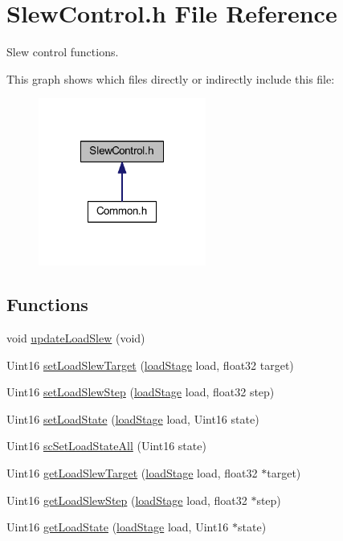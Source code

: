 \hypertarget{a00049}{\section{Slew\-Control.\-h File Reference}
\label{a00049}
}


Slew control functions.  


This graph shows which files directly or indirectly include this file\-:
\nopagebreak
\begin{figure}[H]
\begin{center}
\leavevmode
\includegraphics[width=156pt]{a00077}
\end{center}
\end{figure}
\subsection*{Functions}
\begin{DoxyCompactItemize}
\item 
void \hyperlink{a00049_a781fe23cb47009003e6d7b8343a377fa}{update\-Load\-Slew} (void)
\item 
Uint16 \hyperlink{a00049_af91ad2be323d5d0c10e6127418690811}{set\-Load\-Slew\-Target} (\hyperlink{a00027_a2820f1e18d921d2f1e97d53404b9fbae}{load\-Stage} load, float32 target)
\item 
Uint16 \hyperlink{a00049_ae38c51e6a504a6fd7a77edb6a3a06656}{set\-Load\-Slew\-Step} (\hyperlink{a00027_a2820f1e18d921d2f1e97d53404b9fbae}{load\-Stage} load, float32 step)
\item 
Uint16 \hyperlink{a00049_a567e736b557aa3dd69472d13f96ea006}{set\-Load\-State} (\hyperlink{a00027_a2820f1e18d921d2f1e97d53404b9fbae}{load\-Stage} load, Uint16 state)
\item 
Uint16 \hyperlink{a00049_a68d48d3f3c783662c131f2407f9e8792}{sc\-Set\-Load\-State\-All} (Uint16 state)
\item 
Uint16 \hyperlink{a00049_a90d0ebd5af992cd41a3fd3878e3d9b5a}{get\-Load\-Slew\-Target} (\hyperlink{a00027_a2820f1e18d921d2f1e97d53404b9fbae}{load\-Stage} load, float32 $\ast$target)
\item 
Uint16 \hyperlink{a00049_a33909c7bbfa64f91ef2257ecc97a8d7b}{get\-Load\-Slew\-Step} (\hyperlink{a00027_a2820f1e18d921d2f1e97d53404b9fbae}{load\-Stage} load, float32 $\ast$step)
\item 
Uint16 \hyperlink{a00049_af470a5cd45bfe44d75f6a314c45c256c}{get\-Load\-State} (\hyperlink{a00027_a2820f1e18d921d2f1e97d53404b9fbae}{load\-Stage} load, Uint16 $\ast$state)
\end{DoxyCompactItemize}


